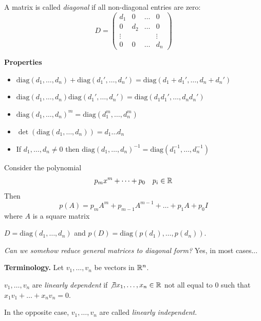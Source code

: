 \documentclass[10pt]{scrartcl}
\begin{document}
\vsp

\begin{definition}A  matrix is called \emph{diagonal} if all non-diagonal entries are zero: 
\[
  D = \begin{pmatrix}
 d_1 & 0 & \dots & 0\\
 0 & d_2 & \dots & 0\\
 \vdots & & & \vdots\\
0 & 0 & \dots & d_n	
 \end{pmatrix}
\]	
\end{definition}\vsp

\textbf{Properties}
\begin{itemize}
\item $\mathrm{diag}(d_1,\dots,d_n) + \mathrm{diag}(d_1',\dots,d_n') = \mathrm{diag}(d_1 + d_1', \dots, d_n + d_n')$
\item 	$\mathrm{diag}(d_1,\dots,d_n)\mathrm{diag}(d_1',\dots,d_n') = \mathrm{diag}(d_1d_1', \dots, d_nd_n')$
\item $\mathrm{diag}(d_1,\dots,d_n)^m = \mathrm{diag}(d_1^m,\dots,d_n^m)$
\item $\det(\mathrm{diag}(d_1,\dots,d_n)) = d_1\dots d_n$
\item If $d_1,\dots,d_n \neq 0$ then $\mathrm{diag}(d_1,\dots,d_n)^{-1} = \mathrm{diag}(d_1^{-1},\dots,d_n^{-1})$
\end{itemize}

Consider the polynomial 
\[
  p_mx^m + \dots + p_0\quad p_i\in\mathbb{R}
\]
Then 
\[
 p(A) = p_mA^m + p_{m-1}A^{m-1} + \dots + p_1A + p_0I 
\]
where $A$ is a square matrix

$D = \mathrm{diag}(d_1,\dots,d_n)$ and $p(D) = \mathrm{diag}(p(d_1),\dots,p(d_n))$. 

\emph{Can we somehow reduce general matrices to diagonal form?} Yes, in most cases...

\textbf{Terminology.} Let $v_1,\dots,v_n$ be vectors in $\mathbb{R}^n$.\\

\begin{definition}
$v_1,\dots,v_n$ are \emph{linearly dependent} if $\not\exists x_1,\dots,x_n \in\mathbb{R}$ not all equal to $0$ such that $x_1v_1 + \dots + x_nv_n = 0$.

 In the opposite case, $v_1,\dots,v_n$ are called \emph{linearly independent}. 	
\end{definition}\vsp
\end{document}
